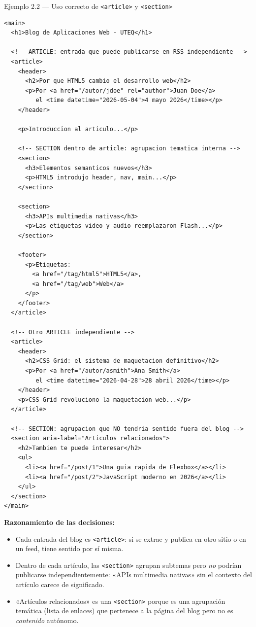 \begin{cajaejemplo}{Ejemplo 2.2 --- Uso correcto de \texttt{<article>} y \texttt{<section>}}
\begin{lstlisting}[style=html,caption={blog.html (extracto significativo)},label=lst:2.5]
<main>
  <h1>Blog de Aplicaciones Web - UTEQ</h1>

  <!-- ARTICLE: entrada que puede publicarse en RSS independiente -->
  <article>
    <header>
      <h2>Por que HTML5 cambio el desarrollo web</h2>
      <p>Por <a href="/autor/jdoe" rel="author">Juan Doe</a>
         el <time datetime="2026-05-04">4 mayo 2026</time></p>
    </header>

    <p>Introduccion al articulo...</p>

    <!-- SECTION dentro de article: agrupacion tematica interna -->
    <section>
      <h3>Elementos semanticos nuevos</h3>
      <p>HTML5 introdujo header, nav, main...</p>
    </section>

    <section>
      <h3>APIs multimedia nativas</h3>
      <p>Las etiquetas video y audio reemplazaron Flash...</p>
    </section>

    <footer>
      <p>Etiquetas:
        <a href="/tag/html5">HTML5</a>,
        <a href="/tag/web">Web</a>
      </p>
    </footer>
  </article>

  <!-- Otro ARTICLE independiente -->
  <article>
    <header>
      <h2>CSS Grid: el sistema de maquetacion definitivo</h2>
      <p>Por <a href="/autor/asmith">Ana Smith</a>
         el <time datetime="2026-04-28">28 abril 2026</time></p>
    </header>
    <p>CSS Grid revoluciono la maquetacion web...</p>
  </article>

  <!-- SECTION: agrupacion que NO tendria sentido fuera del blog -->
  <section aria-label="Articulos relacionados">
    <h2>Tambien te puede interesar</h2>
    <ul>
      <li><a href="/post/1">Una guia rapida de Flexbox</a></li>
      <li><a href="/post/2">JavaScript moderno en 2026</a></li>
    </ul>
  </section>
</main>
\end{lstlisting}

\textbf{Razonamiento de las decisiones:}
\begin{itemize}
\item Cada entrada del blog es \texttt{<article>}: si se extrae y
publica en otro sitio o en un feed, tiene sentido por sí misma.
\item Dentro de cada artículo, las \texttt{<section>} agrupan
subtemas pero \emph{no} podrían publicarse independientemente: «APIs
multimedia nativas» sin el contexto del artículo carece de
significado.
\item «Artículos relacionados» es una \texttt{<section>} porque es
una agrupación temática (lista de enlaces) que pertenece a la página
del blog pero no es \emph{contenido} autónomo.
\end{itemize}
\end{cajaejemplo}


